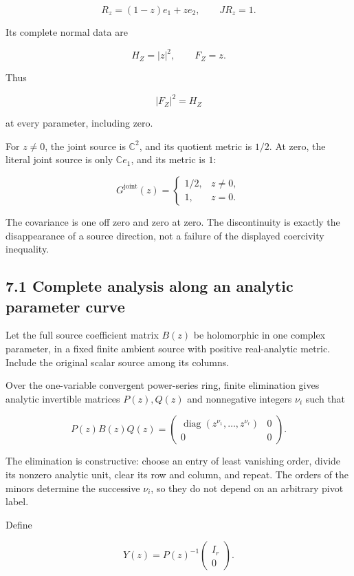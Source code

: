 \[
R_z=(1-z)e_1+ze_2,
\qquad JR_z=1.
\]

Its complete normal data are

\[
H_Z=|z|^2,\qquad F_Z=z.
\]

Thus

\[
|F_Z|^2=H_Z
\]

at every parameter, including zero.

For \(z\ne0\), the joint source is \(\mathbb C^2\), and its quotient metric is \(1/2\). At zero, the literal joint source is only \(\mathbb Ce_1\), and its metric is \(1\):

\[
\boxed{
G^{\mathrm{joint}}(z)=
\begin{cases}
1/2,&z\ne0,\\
1,&z=0.
\end{cases}}
\tag{43}
\]

The covariance is one off zero and zero at zero. The discontinuity is exactly the disappearance of a source direction, not a failure of the displayed coercivity inequality.

\subsection{7.1 Complete analysis along an analytic parameter curve}\label{complete-analysis-along-an-analytic-parameter-curve}

Let the full source coefficient matrix \(B(z)\) be holomorphic in one complex parameter, in a fixed finite ambient source with positive real-analytic metric. Include the original scalar source among its columns.

Over the one-variable convergent power-series ring, finite elimination gives analytic invertible matrices \(P(z),Q(z)\) and nonnegative integers \(\nu_i\) such that

\[
\boxed{
P(z)B(z)Q(z)
=
\begin{pmatrix}
\operatorname{diag}(z^{\nu_1},\ldots,z^{\nu_r})&0\\
0&0
\end{pmatrix}.
}
\tag{44}
\]

The elimination is constructive: choose an entry of least vanishing order, divide its nonzero analytic unit, clear its row and column, and repeat. The orders of the minors determine the successive \(\nu_i\), so they do not depend on an arbitrary pivot label.

Define

\[
Y(z)=P(z)^{-1}
\begin{pmatrix}I_r\\0\end{pmatrix}.
\]

